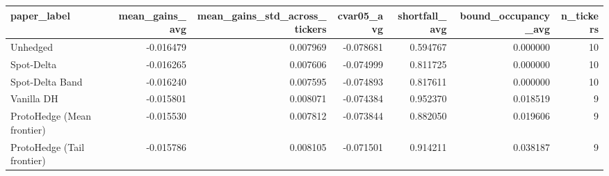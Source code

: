 \begin{tabular}{lrrrrrr}
\toprule
paper_label & mean_gains_avg & mean_gains_std_across_tickers & cvar05_avg & shortfall_avg & bound_occupancy_avg & n_tickers \\
\midrule
Unhedged & -0.016479 & 0.007969 & -0.078681 & 0.594767 & 0.000000 & 10 \\
Spot-Delta & -0.016265 & 0.007606 & -0.074999 & 0.811725 & 0.000000 & 10 \\
Spot-Delta Band & -0.016240 & 0.007595 & -0.074893 & 0.817611 & 0.000000 & 10 \\
Vanilla DH & -0.015801 & 0.008071 & -0.074384 & 0.952370 & 0.018519 & 9 \\
ProtoHedge (Mean frontier) & -0.015530 & 0.007812 & -0.073844 & 0.882050 & 0.019606 & 9 \\
ProtoHedge (Tail frontier) & -0.015786 & 0.008105 & -0.071501 & 0.914211 & 0.038187 & 9 \\
\bottomrule
\end{tabular}
